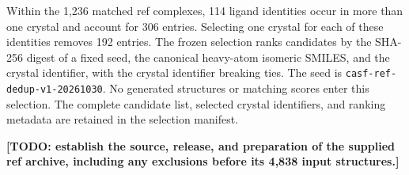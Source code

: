 Within the 1,236 matched ref complexes, 114 ligand identities occur in more than one
crystal and account for 306 entries. Selecting one crystal for each of these identities
removes 192 entries. The frozen selection ranks candidates by the SHA-256 digest of a
fixed seed, the canonical heavy-atom isomeric SMILES, and the crystal identifier, with
the crystal identifier breaking ties. The seed is
\texttt{casf-ref-dedup-v1-20261030}. No generated structures or matching scores enter
this selection. The complete candidate list, selected crystal identifiers, and ranking
metadata are retained in the selection manifest.

\textbf{[TODO: establish the source, release, and preparation of the supplied ref archive,
including any exclusions before its 4,838 input structures.]}
